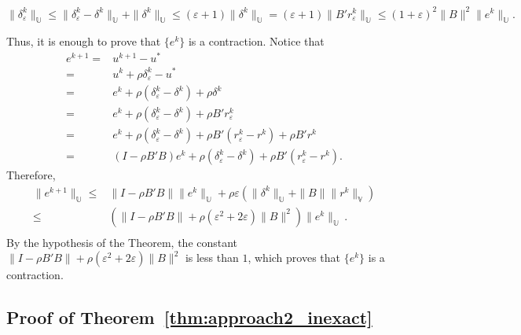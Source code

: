 \documentclass{article}
\theoremstyle{definition}
\begin{document}
\begin{equation}\label{eq:dk}
\|\delta_\varepsilon^k\|_\mathbb{U}\leq \|\delta_\varepsilon^k-\delta^k\|_\mathbb{U}+\|\delta^k\|_\mathbb{U}
\leq (\varepsilon+1)\|\delta^k\|_\mathbb{U}=(\varepsilon+1)\|B'r_\varepsilon^k\|_\mathbb{U}
\leq (1+\varepsilon)^2\|B\|^2 \|e^k\|_\mathbb{U}. 
\end{equation}

Thus, it is enough to prove that $\{e^k\}$ is a contraction. Notice that
$$
\begin{array}{rl}
e^{k+1}= & u^{k+1}-u^*\\
= &  u^k+\rho\delta_\varepsilon^k -u^*\\
= & e^k + \rho(\delta^k_\varepsilon-\delta^k) +\rho \delta^k\\
= & e^k + \rho(\delta^k_\varepsilon-\delta^k) + \rho B'r_\varepsilon^k\\
= & e^k + \rho(\delta^k_\varepsilon-\delta^k) + \rho B'(r_\varepsilon^k-r^k) + \rho B'r^k\\
= & (I-\rho B'B)e^k + \rho(\delta^k_\varepsilon-\delta^k) + \rho B'(r_\varepsilon^k-r^k).
\end{array}
$$
Therefore,
$$
\begin{array}{rl}
\|e^{k+1}\|_\mathbb{U} \leq &  \|I-\rho B'B\| \|e^k\|_\mathbb{U}
+\rho \varepsilon( \|\delta^k\|_\mathbb{U} + \|B\|\|r^k\|_\mathbb{V})\\
\le &  \left(\|I-\rho B'B\|+ \rho (\varepsilon^2+2\varepsilon)\|B\|^2\right)\|e^k\|_\mathbb{U}\,.\\
\end{array}
$$
By the hypothesis of the Theorem, the constant $\|I-\rho B'B\|+ \rho (\varepsilon^2+2\varepsilon)\|B\|^2$ is less than $1$, which proves that $\{e^k\}$ is a contraction.

\subsection{Proof of Theorem~\ref{thm:approach2_inexact}}
\label{sec:proof_thm2}
\end{document}
